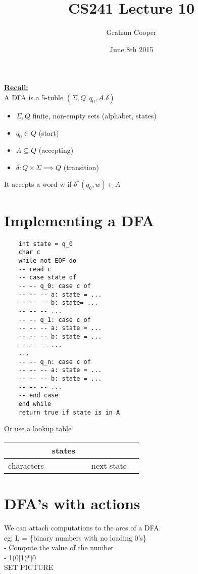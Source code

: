 \documentclass[12pt]{article}
\title{\vspace{-15ex}CS241 Lecture 10\vspace{-1ex}}
\date{June 8th 2015}
\author{Graham Cooper}
\newcommand{\myt}[1]{\textbf{\underline{#1}}}
\begin{document}
	\maketitle
	
	\myt{Recall:}\\
	A DFA is a 5-tuble $(\Sigma, Q, q_0, A. \delta)$\\
	\begin{itemize}
		\item $\Sigma, Q$ finite, non-empty sets (alphabet, states)
		\item $q_0 \in Q$ (start)
		\item $A \subseteq Q$ (accepting)
		\item $\delta:  Q \times \Sigma \implies Q$ (transition)
	\end{itemize}
	It accepts a word w if $\delta^*(q_0, w) \in A$\\
	
	\section*{Implementing a DFA}
	
	\begin{verbatim}
	int state = q_0
	char c
	while not EOF do
	-- read c
	-- case state of
	-- -- q_0: case c of
	-- -- -- a: state = ...
	-- -- -- b: state= ...
	-- -- -- ...
	-- -- q_1: case c of
	-- -- -- a: state = ...
	-- -- -- b: state = ...
	-- -- -- ...
	...
	-- -- q_n: case c of
	-- -- -- a: state = ...
	-- -- -- b: state = ...
	-- -- -- ...
	-- end case
	end while
	return true if state is in A
	\end{verbatim}
	
	Or use a lookup table
	
	\begin{tabular}{c | c c | c | c }
		& states & & & \\ \hline
		characters & & & next state & \\ \hline
	\end{tabular}
	
	\section*{DFA's with actions}
	We can attach computations to the arcs of a DFA.\\
	
	eg: L = \{binary numbers with no loading 0's\}\\
	- Compute the value of the number\\
	- 1(0$|$1)*$|$0\\
	SET PICTURE\\
	
\end{document}

